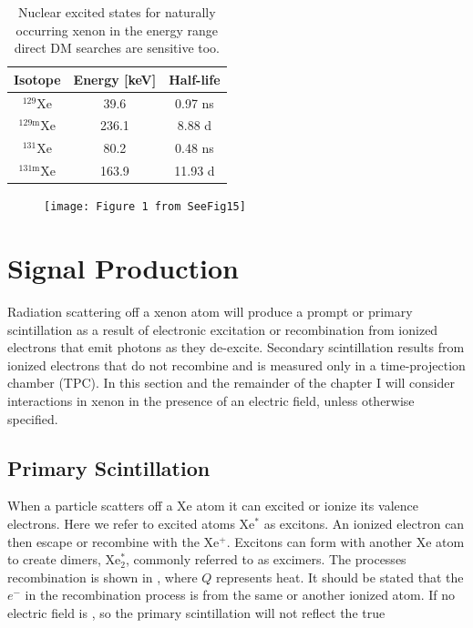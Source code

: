 \begin{table}
 \centering
 \begin{tabular}{ccc}
 \hline
 Isotope & Energy [keV] & Half-life \\
 \hline
 $^{129}$Xe & 39.6 & 0.97 ns & \\
 $^{129\mathrm{m}}$Xe & 236.1 & 8.88 d \\
 $^{131}$Xe & 80.2 & 0.48 ns \\
 $^{131\mathrm{m}}$Xe & 163.9 & 11.93 d \\
 \hline
 \end{tabular}
 \caption{Nuclear excited states for naturally occurring xenon in the energy range direct DM searches are sensitive too.}
 \label{tab:xe_radioactive}
\end{table}

\begin{figure}
\centering
\texttt{[image: Figure 1 from SeeFig15]}
\end{figure}



\section{Signal Production}
\label{sec:scintillation}
Radiation scattering off a xenon atom will produce a prompt or primary scintillation as a result of electronic excitation or recombination
from ionized electrons that emit photons as they de-excite.  Secondary scintillation results from ionized
electrons that do not recombine and is measured only in a time-projection
chamber (TPC).  In this section
and the remainder of the chapter I will consider interactions in xenon in the presence of an electric field, unless otherwise
specified.



\subsection{Primary Scintillation}
\label{subsec:primary}
When a particle scatters off a Xe atom it can excited or ionize its valence electrons.  Here we refer to excited atoms Xe$^{*}$ as
excitons.  An ionized electron can then escape or recombine with the Xe$^{+}$.  Excitons can form with another Xe atom to create
dimers, Xe$_{2}^{*}$, commonly referred to as excimers.  The processes recombination is shown in , where $Q$
represents heat.  It should be stated that the $e^{-}$ in the recombination process is from the same or another ionized atom.  If
no electric field is , so the primary scintillation will not reflect the true

